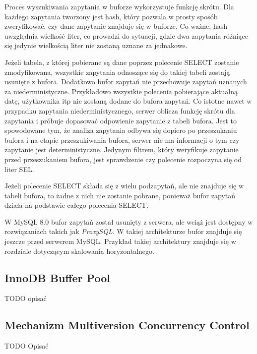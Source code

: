 Proces wyszukiwania zapytania w buforze wykorzystuje funkcję skrótu. Dla każdego zapytania tworzony jest hash, który pozwala w prosty sposób zweryfikować, czy dane zapytanie znajduje się w buforze. Co ważne, hash uwzględnia wielkość liter, co prowadzi do sytuacji, gdzie dwa zapytania różniące się jedynie wielkością liter nie zostaną uznane za jednakowe.

Jeżeli tabela, z której pobierane są dane poprzez polecenie SELECT  zostanie zmodyfikowana, wszystkie zapytania odnoszące się do takiej tabeli zostają usunięte z bufora. Dodatkowo bufor zapytań nie przechowuje zapytań uznanych za niederministyczne. Przykładowo wszystkie polecenia pobierające aktualną datę, użytkownika itp nie zostaną dodane do bufora zapytań. Co istotne nawet w przypadku zapytania niederministycznego, serwer oblicza funkcję skrótu dla zapytania i próbuje dopasować odpowienie zapytanie z tabeli bufora. Jest to spowodowane tym, że analiza zapytania odbywa się dopiero po przeszukaniu bufora i na etapie przeszukiwania bufora, serwer nie ma informacji o tym czy zapytanie jest deterministyczne. Jedynym filtrem, który weryfikuje zapytanie przed przeszukaniem bufora, jest sprawdzenie czy polecenie rozpoczyna się od liter SEL.

Jeżeli polecenie SELECT składa się z wielu podzapytań, ale nie znajduje się w tabeli bufora, to żadne z nich nie zostanie pobrane, ponieważ bufor zapytań działa na podstawie całego polecenia SELECT.

W MySQL 8.0 bufor zapytań został usunięty z serwera, ale wciąż jest dostępny w rozwiązaniach takich jak \textit{ProxySQL}. W takiej architekturze bufor znajduje się jeszcze przed serwerem MySQL. Przykład takiej architektury znajduje się w rozdziale dotyczącym skalowania horyzontalnego.

\subsection{InnoDB Buffer Pool}
TODO opisać
\subsection{Mechanizm Multiversion Concurrency Control}
TODO Opisać


